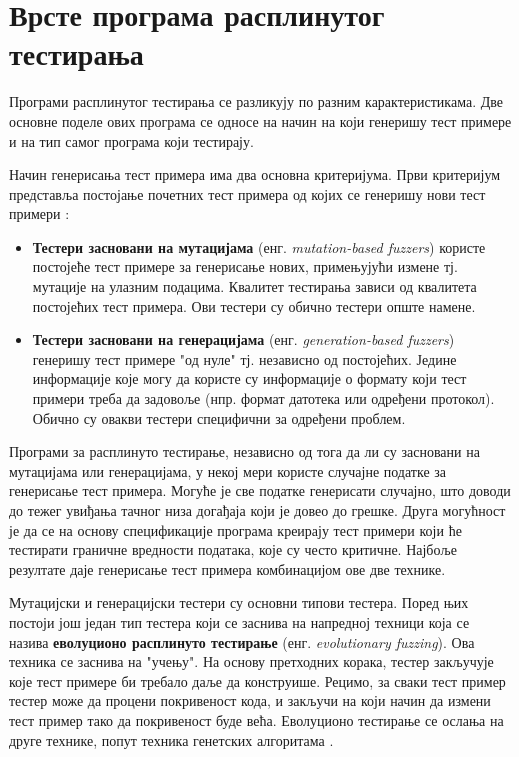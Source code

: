 \documentclass[12pt,oneside]{memoir}
\begin{document}
\section{Врсте програма расплинутог тестирања}
\label{sec:vrsteProRaspTest}

Програми расплинутог тестирања се разликују по разним карактеристикама. Две основне поделе ових програма се односе на начин на који генеришу тест примере и на тип самог програма који тестирају.

Начин генерисања тест примера има два основна критеријума.
Први критеријум представља постојање почетних тест примера од којих се генеришу нови тест примери \cite{fuzzingBrute, fuzzing}:
\begin{itemize}
\item \textbf{Тестери засновани на мутацијама} (енг. \textit{mutation-based fuzzers}) користе постојеће тест примере за генерисање нових, примењујући измене тј. мутације на улазним подацима. Квалитет тестирања зависи од квалитета постојећих тест примера. Ови тестери су обично тестери опште намене. 
\item \textbf{Тестери засновани на генерацијама} (енг. \textit{generation-based fuzzers}) генеришу тест примере "од нуле" тј. независно од постојећих. Једине информације које могу да користе су информације о формату који тест примери треба да задовоље (нпр. формат датотека или одређени протокол). Обично су овакви тестери специфични за одређени проблем.
\end{itemize}

Програми за расплинуто тестирање, независно од тога да ли су засновани на мутацијама или генерацијама, у некој мери користе случајне податке за генерисање тест примера. Могуће је све податке генерисати случајно, што доводи до тежег увиђања тачног низа догађаја који је довео до грешке. Друга могућност је да се на основу спецификације програма креирају тест примери који ће тестирати граничне вредности података, које су често критичне. Најбоље резултате даје генерисање тест примера комбинацијом ове две технике.

Мутацијски и генерацијски тестери су основни типови тестера. Поред њих постоји још један тип тестера који се заснива на напредној техници која се назива \textbf{еволуционо расплинуто тестирање} (енг. \textit{evolutionary fuzzing}). Ова техника се заснива на "учењу". На основу претходних корака, тестер закључује које тест примере би требало даље да конструише. Рецимо, за сваки тест пример тестер може да процени покривеност кода, и закључи на који начин да измени тест пример тако да покривеност буде већа. Еволуционо тестирање се ослања на друге технике, попут техника генетских алгоритама \cite{fuzzing, 15minuteGuide}.
\end{document}
